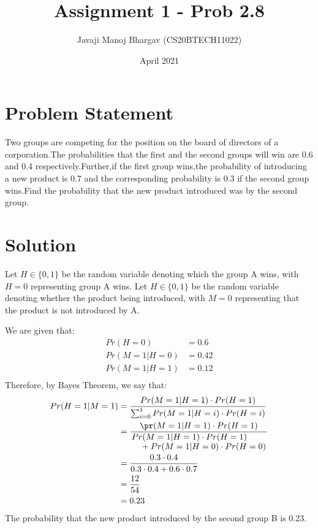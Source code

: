 \documentclass{article}
\title{Assignment 1 - Prob 2.8}
\author{Javaji Manoj Bhargav (CS20BTECH11022)}
\date{April 2021}
\begin{document}
\maketitle

\section{Problem Statement}
Two groups are competing for the position on the board of directors of a corporation.The probabilities that the first and the second groups will win are 0.6 and 0.4 respectively.Further,if the first group wins,the probability of introducing a new product is 0.7 and the corresponding probability is 0.3 if the second group wins.Find the probability that the new product introduced was by the second group.
\section{Solution}
Let $H \in \{0,1\}$ be the random variable denoting which the group A wins, with $H=0$ representing group A wins. Let $H \in \{0,1\}$ be the random variable denoting whether the product being introduced, with $M=0$ representing that the product is not introduced by A. 

We are given that:
\begin{align*}
Pr(H=0)&=0.6\\
Pr(M=1|H=0)&=0.42\\
Pr(M=1|H=1)&=0.12\\
\end{align*}
Therefore, by Bayes Theorem, we say that:
\begin{align*}
Pr(H=1\vert M=1)&=\frac{Pr(M=1\vert H=1)\cdot Pr(H=1)}{\sum_{i=0}^{1} Pr(M=1\vert H=i)\cdot Pr(H=i)}\\
&=\frac{\pr(M=1 \vert H=1)\cdot Pr(H=1)}{\splitfrac{Pr(M=1\vert H=1)\cdot Pr(H=1)}{+Pr(M=1\vert H=0)\cdot Pr(H=0)}}\\
&=\dfrac{0.3\cdot 0.4}{0.3\cdot 0.4 + 0.6\cdot 0.7}\\
&=\dfrac{12}{54}\\
&=0.23
\end{align*}
The probability that the new product introduced by the second group B is 0.23.
\end{document}
